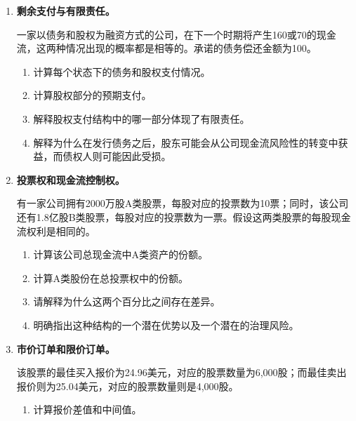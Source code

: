 \begin{enumerate}

\item \textbf{剩余支付与有限责任。}

一家以债务和股权为融资方式的公司，在下一个时期将产生160或70的现金流，这两种情况出现的概率都是相等的。承诺的债务偿还金额为100。

\begin{enumerate}

\item 计算每个状态下的债务和股权支付情况。

\item 计算股权部分的预期支付。

\item 解释股权支付结构中的哪一部分体现了有限责任。

\item 解释为什么在发行债务之后，股东可能会从公司现金流风险性的转变中获益，而债权人则可能因此受损。

\end{enumerate}

\item \textbf{投票权和现金流控制权。}

有一家公司拥有2000万股A类股票，每股对应的投票数为10票；同时，该公司还有1.8亿股B类股票，每股对应的投票数为一票。假设这两类股票的每股现金流权利是相同的。

\begin{enumerate}

\item 计算该公司总现金流中A类资产的份额。

\item 计算A类股份在总投票权中的份额。

\item 请解释为什么这两个百分比之间存在差异。

\item 明确指出这种结构的一个潜在优势以及一个潜在的治理风险。

\end{enumerate}

\item \textbf{市价订单和限价订单。}

该股票的最佳买入报价为24.96美元，对应的股票数量为6,000股；而最佳卖出报价则为25.04美元，对应的股票数量则是4,000股。

\begin{enumerate}

\item 计算报价差值和中间值。


\end{enumerate}
\end{enumerate}
